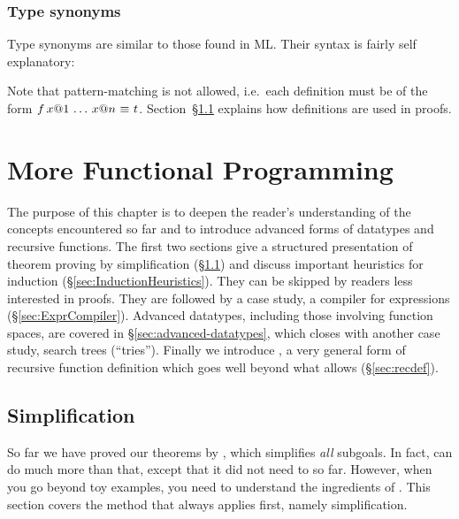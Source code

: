 \subsection{Type synonyms}

Type synonyms are similar to those found in ML\@. Their syntax is fairly self
explanatory:

%

Note that pattern-matching is not allowed, i.e.\ each definition must be of
the form $f\,x@1\,\dots\,x@n~\emph{$\equiv$}~t$.
Section~{\S}\ref{sec:Simplification} explains how definitions are used
in proofs.




\chapter{More Functional Programming}

The purpose of this chapter is to deepen the reader's understanding of the
concepts encountered so far and to introduce advanced forms of datatypes and
recursive functions. The first two sections give a structured presentation of
theorem proving by simplification ({\S}\ref{sec:Simplification}) and discuss
important heuristics for induction ({\S}\ref{sec:InductionHeuristics}). They can
be skipped by readers less interested in proofs. They are followed by a case
study, a compiler for expressions ({\S}\ref{sec:ExprCompiler}). Advanced
datatypes, including those involving function spaces, are covered in
{\S}\ref{sec:advanced-datatypes}, which closes with another case study, search
trees (``tries'').  Finally we introduce , a very general
form of recursive function definition which goes well beyond what
 allows ({\S}\ref{sec:recdef}).


\section{Simplification}
\label{sec:Simplification}

So far we have proved our theorems by , which simplifies
\emph{all} subgoals. In fact,  can do much more than that, except
that it did not need to so far. However, when you go beyond toy examples, you
need to understand the ingredients of .  This section covers the
method that  always applies first, namely simplification.

